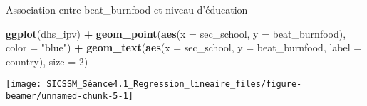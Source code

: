 \documentclass[ignorenonframetext,]{beamer}
\newenvironment{Shaded}{\begin{snugshade}}{\end{snugshade}}
\newcommand{\KeywordTok}[1]{\textcolor[rgb]{0.13,0.29,0.53}{\textbf{#1}}}
\newcommand{\DataTypeTok}[1]{\textcolor[rgb]{0.13,0.29,0.53}{#1}}
\newcommand{\DecValTok}[1]{\textcolor[rgb]{0.00,0.00,0.81}{#1}}
\newcommand{\StringTok}[1]{\textcolor[rgb]{0.31,0.60,0.02}{#1}}
\newcommand{\OperatorTok}[1]{\textcolor[rgb]{0.81,0.36,0.00}{\textbf{#1}}}
\newcommand{\NormalTok}[1]{#1}
\begin{document}
\begin{frame}[fragile]{Association entre beat\_burnfood et niveau
d'éducation}

\begin{Shaded}
\begin{Highlighting}[]
\KeywordTok{ggplot}\NormalTok{(dhs_ipv) }\OperatorTok{+}
\StringTok{  }\KeywordTok{geom_point}\NormalTok{(}\KeywordTok{aes}\NormalTok{(}\DataTypeTok{x =}\NormalTok{ sec_school, }\DataTypeTok{y =}\NormalTok{ beat_burnfood), }\DataTypeTok{color =} \StringTok{"blue"}\NormalTok{) }\OperatorTok{+}
\StringTok{  }\KeywordTok{geom_text}\NormalTok{(}\KeywordTok{aes}\NormalTok{(}\DataTypeTok{x =}\NormalTok{ sec_school, }\DataTypeTok{y =}\NormalTok{ beat_burnfood, }\DataTypeTok{label =}\NormalTok{ country), }\DataTypeTok{size =} \DecValTok{2}\NormalTok{)}
\end{Highlighting}
\end{Shaded}

\texttt{[image: SICSSM\_Séance4.1\_Regression\_lineaire\_files/figure-beamer/unnamed-chunk-5-1]}

\end{frame}
\end{document}
